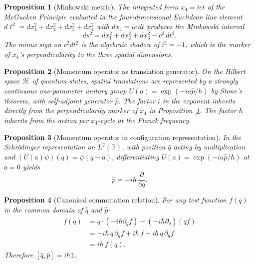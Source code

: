 \documentclass[11pt,a4paper]{article}
\newtheorem{proposition}{Proposition}
\begin{document}
\begin{proposition}[Minkowski metric]
\label{prop:H1}
The integrated form $x_4 = ict$ of the McGucken Principle evaluated in the four-dimensional Euclidean line element $d\ell^2 = dx_1^2 + dx_2^2 + dx_3^2 + dx_4^2$ with $dx_4 = ic\,dt$ produces the Minkowski interval
\begin{equation}
ds^2 = dx_1^2 + dx_2^2 + dx_3^2 - c^2\,dt^2.
\end{equation}
The minus sign on $c^2 dt^2$ is the algebraic shadow of $i^2 = -1$, which is the marker of $x_4$'s perpendicularity to the three spatial dimensions.
\end{proposition}

\begin{proposition}[Momentum operator as translation generator]
\label{prop:H2}
On the Hilbert space $\mathcal{H}$ of quantum states, spatial translations are represented by a strongly continuous one-parameter unitary group $U(a) = \exp(-ia\hat{p}/\hbar)$ by Stone's theorem, with self-adjoint generator $\hat{p}$. The factor $i$ in the exponent inherits directly from the perpendicularity marker of $x_4$ in Proposition~\ref{prop:H1}. The factor $\hbar$ inherits from the action per $x_4$-cycle at the Planck frequency.
\end{proposition}

\begin{proposition}[Momentum operator in configuration representation]
\label{prop:H3}
In the Schr\"odinger representation on $L^2(\mathbb{R})$, with position $\hat{q}$ acting by multiplication and $(U(a)\psi)(q) = \psi(q-a)$, differentiating $U(a) = \exp(-ia\hat{p}/\hbar)$ at $a=0$ yields
\begin{equation}
\hat{p} = -i\hbar\,\frac{\partial}{\partial q}.
\end{equation}
\end{proposition}

\begin{proposition}[Canonical commutation relation]
\label{prop:H4}
For any test function $f(q)$ in the common domain of $\hat{q}$ and $\hat{p}$:
\begin{align}
[\hat{q}, \hat{p}] f(q) &= q \cdot (-i\hbar \partial_q f) - (-i\hbar \partial_q)(q f) \\
&= -i\hbar\, q\, \partial_q f + i\hbar\, f + i\hbar\, q\, \partial_q f \\
&= i\hbar\, f(q).
\end{align}
Therefore $[\hat{q}, \hat{p}] = i\hbar \mathbb{1}$.
\end{proposition}
\end{document}
